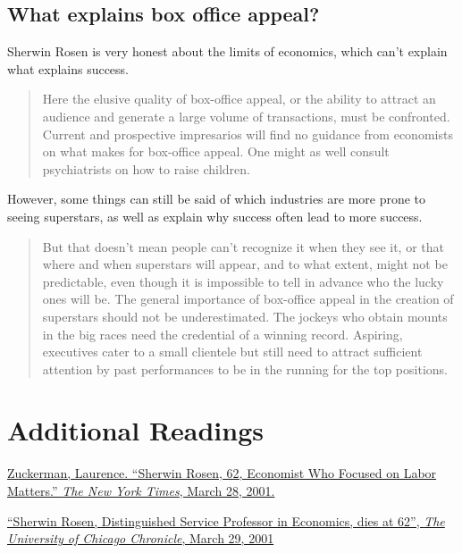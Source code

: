 \documentclass[]{book}
\theoremstyle{definition}
\theoremstyle{definition}
\theoremstyle{definition}
\theoremstyle{remark}
\begin{document}
\subsection{What explains box office
appeal?}\label{what-explains-box-office-appeal}

Sherwin Rosen is very honest about the limits of economics, which can't
explain what explains success.

\begin{quote}
Here the elusive quality of box-office appeal, or the ability to attract
an audience and generate a large volume of transactions, must be
confronted. Current and prospective impresarios will find no guidance
from economists on what makes for box-office appeal. One might as well
consult psychiatrists on how to raise children.
\end{quote}

However, some things can still be said of which industries are more
prone to seeing superstars, as well as explain why success often lead to
more success.

\begin{quote}
But that doesn't mean people can't recognize it when they see it, or
that where and when superstars will appear, and to what extent, might
not be predictable, even though it is impossible to tell in advance who
the lucky ones will be. The general importance of box-office appeal in
the creation of superstars should not be underestimated. The jockeys who
obtain mounts in the big races need the credential of a winning record.
Aspiring, executives cater to a small clientele but still need to
attract sufficient attention by past performances to be in the running
for the top positions.
\end{quote}

\section*{Additional Readings}\label{additional-readings}

\href{https://www.nytimes.com/2001/03/28/business/sherwin-rosen-62-economist-who-focused-on-labor-matters.html}{Zuckerman,
Laurence. ``Sherwin Rosen, 62, Economist Who Focused on Labor Matters.''
\emph{The New York Times}, March 28, 2001.}

\href{http://chronicle.uchicago.edu/010329/obit-rosen.shtml}{``Sherwin
Rosen, Distinguished Service Professor in Economics, dies at 62'',
\emph{The University of Chicago Chronicle}, March 29, 2001}
\end{document}
